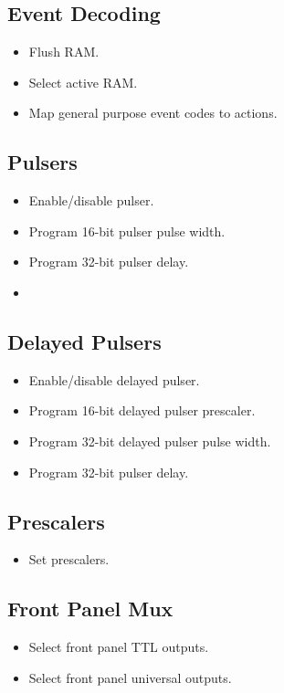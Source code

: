 \documentclass[a4paper,10pt]{article}
\begin{document}
	\subsection{Event Decoding}
	\begin{itemize}
		\item Flush RAM.
		\item Select active RAM.
		\item Map general purpose event codes to actions.
	\end{itemize}

	\subsection{Pulsers}
	\begin{itemize}
		\item Enable/disable pulser.
		\item Program 16-bit pulser pulse width.
		\item Program 32-bit pulser delay.
		\item 
	\end{itemize}

	\subsection{Delayed Pulsers}
	\begin{itemize}
		\item Enable/disable delayed pulser.
		\item Program 16-bit delayed pulser prescaler.
		\item Program 32-bit delayed pulser pulse width.
		\item Program 32-bit pulser delay.
	\end{itemize}

	\subsection{Prescalers}
	\begin{itemize}
		\item Set prescalers.
	\end{itemize}

	\subsection{Front Panel Mux}
	\begin{itemize}
		\item Select front panel TTL outputs.
		\item Select front panel universal outputs.
	\end{itemize}
\end{document}
